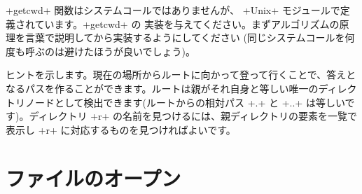 \begin{exercise}
\ml+getcwd+ 関数はシステムコールではありませんが、 \ml+Unix+ モジュールで定義されています。\ml+getcwd+ の  実装を与えてください。まずアルゴリズムの原理を言葉で説明してから実装するようにしてください (同じシステムコールを何度も呼ぶのは避けたほうが良いでしょう)。
\end{exercise}
\begin{answer}
ヒントを示します。現在の場所からルートに向かって登って行くことで、答えとなるパスを作ることができます。ルートは親がそれ自身と等しい唯一のディレクトリノードとして検出できます(ルートからの相対パス \ml+.+ と \ml+..+ は等しいです)。ディレクトリ \ml+r+ の名前を見つけるには、親ディレクトリの要素を一覧で表示し \ml+r+ に対応するものを見つければよいです。
\end{answer}

\section{ファイルのオープン}

